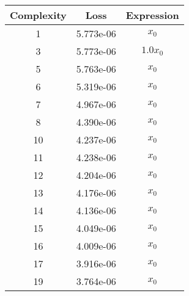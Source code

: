 \begin{center}
        \begin{tabular}{|c|c|c|}
        \hline
        Complexity & Loss & Expression \\
        \hline
        1 & 5.773e-06 & $\begin{aligned}x_{0}\end{aligned}$\\ \hline3 & 5.773e-06 & $\begin{aligned}1.0 x_{0}\end{aligned}$\\ \hline5 & 5.763e-06 & $\begin{aligned}x_{0}\end{aligned}$\\ \hline6 & 5.319e-06 & $\begin{aligned}x_{0}\end{aligned}$\\ \hline7 & 4.967e-06 & $\begin{aligned}x_{0}\end{aligned}$\\ \hline8 & 4.390e-06 & $\begin{aligned}x_{0}\end{aligned}$\\ \hline10 & 4.237e-06 & $\begin{aligned}x_{0}\end{aligned}$\\ \hline11 & 4.238e-06 & $\begin{aligned}x_{0}\end{aligned}$\\ \hline12 & 4.204e-06 & $\begin{aligned}x_{0}\end{aligned}$\\ \hline13 & 4.176e-06 & $\begin{aligned}x_{0}\end{aligned}$\\ \hline14 & 4.136e-06 & $\begin{aligned}x_{0}\end{aligned}$\\ \hline15 & 4.049e-06 & $\begin{aligned}x_{0}\end{aligned}$\\ \hline16 & 4.009e-06 & $\begin{aligned}x_{0}\end{aligned}$\\ \hline17 & 3.916e-06 & $\begin{aligned}x_{0}\end{aligned}$\\ \hline19 & 3.764e-06 & $\begin{aligned}x_{0}\end{aligned}$\\ \hline\end{tabular}
        \end{center}
        